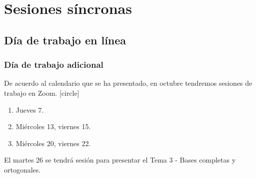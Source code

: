\documentclass[12pt]{beamer}
\begin{document}
\section{Sesiones síncronas}
\subsection{Día de trabajo en línea}

\begin{frame}
\frametitle{Día de trabajo adicional}
De acuerdo al calendario que se ha presentado, en octubre tendremos sesiones de trabajo en Zoom.
\pause
{}
[circle]
\begin{enumerate}[<+->]
\item Jueves 7.
\item Miércoles 13, viernes 15. 
\item Miércoles 20, viernes 22.
\end{enumerate}
\pause
El martes 26 se tendrá sesión para presentar el Tema 3 - Bases completas y ortogonales.
\end{frame}
\end{document}
